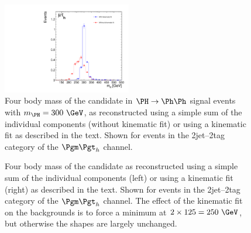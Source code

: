 \begin{figure}
\begin{center}
    \includegraphics[width=0.5\textwidth]
      {plots/Hhh/m_H_kinfit_vs_mttbb_2jet2tagSFMassCuts_mt_ggHTohh300.pdf}

\end{center}
\caption{
Four body mass of the candidate \PH in $\PH\to\Ph\Ph$ signal events with
$m_{\PH}=300~\GeV$, as reconstructed using a simple sum of the
individual components (without kinematic fit) or using a kinematic fit as
described in the text. Shown for events in the 2jet--2tag category of the
$\mutau$ channel.}
\label{fig:kinfitvsmttbb}
\end{figure} 


\begin{figure}
\begin{center}

\end{center}
\caption{
Four body mass of the candidate \PH as reconstructed using a simple sum of the
individual components (left) or using a kinematic fit (right) as
described in the text. Shown for events in the 2jet--2tag category of the
$\mutau$ channel. The effect of the kinematic fit on the backgrounds is to force
a minimum at $2\times125=250~\GeV$, but otherwise the shapes are largely
unchanged.}
\label{fig:kinfitvsmttbb}
\end{figure} 

